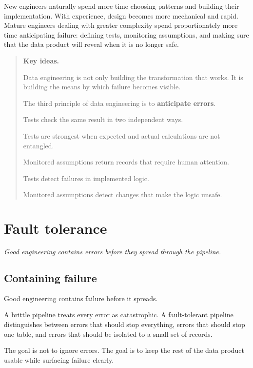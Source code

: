 \documentclass[10pt,openany,10pt]{book}
\begin{document}
New engineers naturally spend more time choosing patterns and building
their implementation. With experience, design becomes more mechanical
and rapid. Mature engineers dealing with greater complexity spend
proportionately more time anticipating failure: defining tests,
monitoring assumptions, and making sure that the data product will
reveal when it is no longer safe.

\begin{quote}
\textbf{Key ideas.}

Data engineering is not only building the transformation that works. It
is building the means by which failure becomes visible.

The third principle of data engineering is to \textbf{anticipate
errors}.

Tests check the same result in two independent ways.

Tests are strongest when expected and actual calculations are not
entangled.

Monitored assumptions return records that require human attention.

Tests detect failures in implemented logic.

Monitored assumptions detect changes that make the logic unsafe.
\end{quote}

\newpage

\chapter{Fault
tolerance}\label{docs-quality-reliability-fault-tolerance}

\emph{Good engineering contains errors before they spread through the
pipeline.}

\section{Containing failure}\label{containing-failure}

Good engineering contains failure before it spreads.

A brittle pipeline treats every error as catastrophic. A fault-tolerant
pipeline distinguishes between errors that should stop everything,
errors that should stop one table, and errors that should be isolated to
a small set of records.

The goal is not to ignore errors. The goal is to keep the rest of the
data product usable while surfacing failure clearly.
\end{document}
